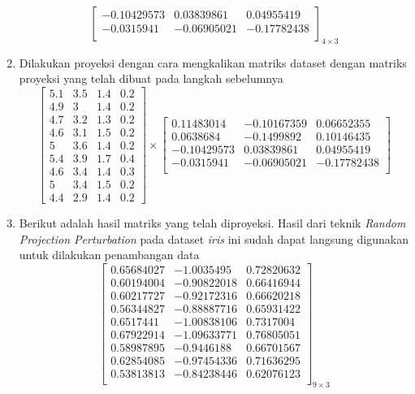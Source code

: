 \begin{enumerate}
\[\begin{bmatrix}
        -0.10429573 &   0.03839861 &   0.04955419 \\
        -0.0315941  &  -0.06905021  & -0.17782438 \\
        \end{bmatrix}_{4\times 3}
    \]
    \item Dilakukan proyeksi dengan cara mengkalikan matriks dataset dengan matriks proyeksi yang telah dibuat pada langkah sebelumnya
    \[
        \begin{bmatrix}
        5.1		&		3.5		&		1.4		&		0.2	\\
        4.9		&		3		&		1.4		&		0.2	\\
        4.7		&		3.2		&		1.3		&		0.2	\\
        4.6		&		3.1		&		1.5		&		0.2	\\
        5		&		3.6		&		1.4		&		0.2	\\
        5.4		&		3.9		&		1.7		&		0.4	\\
        4.6		&		3.4		&		1.4		&		0.3	\\
        5		&		3.4		&		1.5		&		0.2	\\
        4.4		&		2.9		&		1.4		&		0.2 
        \end{bmatrix}
        \times
        \begin{bmatrix}
        0.11483014 &  -0.10167359  &  0.06652355 \\
        0.0638684 &   -0.1499892   &  0.10146435 \\
        -0.10429573 &   0.03839861 &   0.04955419 \\
        -0.0315941  &  -0.06905021  & -0.17782438 \\
        \end{bmatrix}
    \]
    \item Berikut adalah hasil matriks yang telah diproyeksi. Hasil dari teknik \textit{Random Projection Perturbation} pada dataset \textit{iris} ini sudah dapat langsung digunakan untuk dilakukan penambangan data
    \[
        \begin{bmatrix}
        0.65684027 &  -1.0035495   &  0.72820632 \\
        0.60194004 &  -0.90822018  &  0.66416944 \\
        0.60217727  & -0.92172316  &  0.66620218 \\
        0.56344827 &  -0.88887716  &  0.65931422 \\
        0.6517441   & -1.00838106  &  0.7317004  \\
        0.67922914  & -1.09633771  &  0.76805051 \\
        0.58987895  & -0.9446188   &  0.66701567 \\
        0.62854085  & -0.97454336  &  0.71636295 \\
        0.53813813  & -0.84238446  &  0.62076123 \\
        \end{bmatrix}_{9\times 3}
    \]
\end{enumerate}

